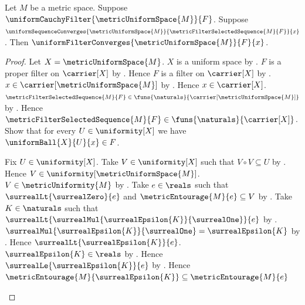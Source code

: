 \begin{proposition}\label{metric_selected_sequence_limit_is_filter_limit}
    Let $M$ be a metric space.
    Suppose $\uniformCauchyFilter{\metricUniformSpace{M}}{F}$.
    Suppose
        $\uniformSequenceConverges{\metricUniformSpace{M}}
            {\metricFilterSelectedSequence{M}{F}}{x}$.
    Then $\uniformFilterConverges{\metricUniformSpace{M}}{F}{x}$.
\end{proposition}
\begin{proof}
    Let $X=\metricUniformSpace{M}$.
    $X$ is a uniform space
        by .
    $F$ is a proper filter on $\carrier[X]$
        by .
    Hence $F$ is a filter on $\carrier[X]$
        by .
    $x\in\carrier[\metricUniformSpace{M}]$ by
        .
    Hence $x\in\carrier[X]$.
    $\metricFilterSelectedSequence{M}{F}
        \in\funs{\naturals}{\carrier[\metricUniformSpace{M}]}$ by
        .
    Hence $\metricFilterSelectedSequence{M}{F}
        \in\funs{\naturals}{\carrier[X]}$.
    Show that for every $U\in\uniformity[X]$ we have
        $\uniformBall{X}{U}{x}\in F$.
    \begin{subproof}
        Fix $U\in\uniformity[X]$.
        Take $V\in\uniformity[X]$ such that
            $V\circ V\subseteq U$
            by .
        Hence $V\in\uniformity[\metricUniformSpace{M}]$.
        $V\in\metricUniformity{M}$
            by .
        Take $e\in\reals$ such that
            $\surrealLt{\surrealZero}{e}$ and
            $\metricEntourage{M}{e}\subseteq V$
            by .
        Take $K\in\naturals$ such that
            $\surrealLt
                {\surrealMul{\surrealEpsilon{K}}{\surrealOne}}{e}$
            by
            .
        $\surrealMul{\surrealEpsilon{K}}{\surrealOne}
            =\surrealEpsilon{K}$
            by
            .
        Hence $\surrealLt{\surrealEpsilon{K}}{e}$.
        $\surrealEpsilon{K}\in\reals$
            by .
        Hence $\surrealLe{\surrealEpsilon{K}}{e}$
            by
            .
        Hence
            $\metricEntourage{M}{\surrealEpsilon{K}}
                \subseteq\metricEntourage{M}{e}$

\end{subproof}
\end{proof}
